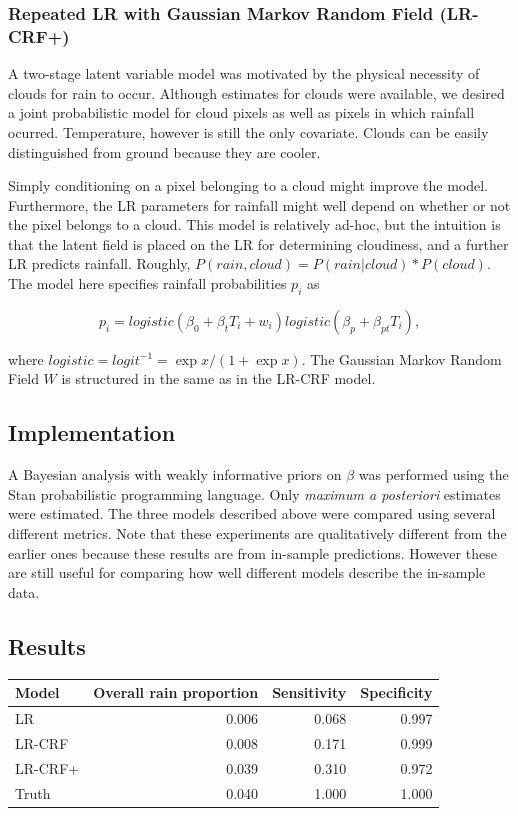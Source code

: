 \subsubsection{Repeated LR with Gaussian Markov Random Field (LR-CRF+)}
A two-stage latent variable model was motivated by the physical necessity of clouds for rain to occur. Although estimates for clouds were available, we desired a joint probabilistic model for cloud pixels as well as pixels in which rainfall ocurred. Temperature, however is still the only covariate. Clouds can be easily distinguished from ground because they are cooler.

Simply conditioning on a pixel belonging to a cloud might improve the model. Furthermore, the LR parameters for rainfall might well depend on whether or not the pixel belongs to a cloud. This model is relatively ad-hoc, but the intuition is that the latent field is placed on the LR for determining cloudiness, and a further LR predicts rainfall. Roughly, $P(rain, cloud)= P(rain| cloud)*P(cloud)$. The model here specifies rainfall probabilities $p_i$ as

$$
p_i = logistic(\beta_0 + \beta_t T_i + w_i)  logistic(\beta_p + \beta_{pt} T_i),
$$

where $logistic=logit^{-1}=\exp{x}/(1+\exp{x})$. The Gaussian Markov Random Field $W$ is structured in the same as in the LR-CRF model.

\subsection{Implementation}
A Bayesian analysis with weakly informative priors on $\beta$ was performed using the Stan probabilistic programming language. Only \emph{maximum a posteriori} estimates were estimated. The three models described above were compared using several different metrics. Note that these experiments are qualitatively different from the earlier ones because these results are from in-sample predictions. However these are still useful for comparing how well different models describe the in-sample data.

\subsection{Results}

\begin{table}[ht]
\centering
\begin{tabular}{lrrr}
  \hline
Model & Overall rain proportion & Sensitivity & Specificity \\ 
  \hline
LR & 0.006 & 0.068 & 0.997 \\ 
  LR-CRF & 0.008 & 0.171 & 0.999 \\ 
  LR-CRF+ & 0.039 & 0.310 & 0.972 \\ 
   \hline
   Truth & 0.040 & 1.000 & 1.000
\end{tabular}
\end{table}

